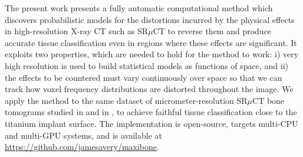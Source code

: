 The present work presents a fully automatic computational method which
discovers probabilistic models for the distortions incurred by the physical
effects in high-resolution X-ray CT such as SR$\mu$CT to reverse them and
produce accurate tissue classification even in regions where these effects are
significant. It exploits two properties, which are needed to hold for the
method to work: i) very high resolution is used to build statistical models as
functions of space, and ii) the effects to be countered must vary continuously
over space so that we can track how voxel frequency distributions are distorted
throughout the image. We apply the method to the same dataset of
micrometer-resolution SR$\mu$CT bone tomograms studied in \cite{torsten2018}
and in \cite{sporring}, to achieve faithful tissue classification close to the
titanium implant surface. The implementation is open-source, targets multi-CPU
and multi-GPU systems, and is available at
\href{https://github.com/jamesavery/maxibone}
{https://github.com/jamesavery/maxibone}.

